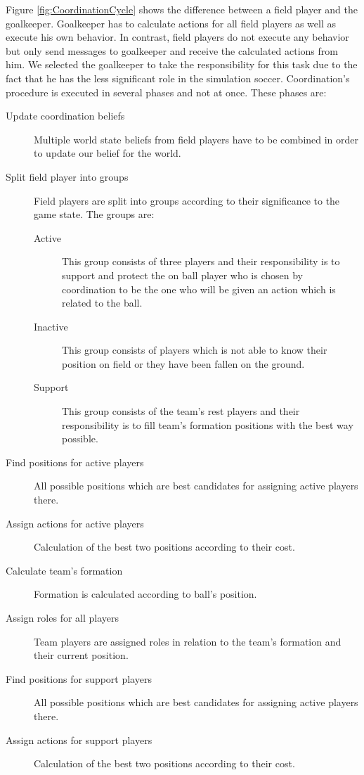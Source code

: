 Figure \ref{fig:CoordinationCycle} shows the difference between a field player and the goalkeeper. Goalkeeper has to calculate actions for all field players as well as execute his own behavior. In contrast, field players do not execute any behavior but only send messages to goalkeeper and receive the calculated actions from him. We selected the goalkeeper to take the responsibility for this task due to the fact that he has the less significant role in the simulation soccer. Coordination's procedure is executed in several phases and not at once. These phases are:
\begin{description}
\item[Update coordination beliefs] Multiple world state beliefs from field players have to be combined in order to update our belief for the world.
\item[Split field player into groups] Field players are split into groups according to their significance to the game state. The groups are:
\begin{description}
\item[Active] This group consists of three players and their responsibility is to support and protect the on ball player who is chosen by coordination to be the one who will be given an action which is related to the ball.
\item[Inactive] This group consists of players which is not able to know their position on field or they have been fallen on the ground.
\item[Support] This group consists of the team's rest players and their responsibility is to fill team's formation positions with the best way possible.
\end{description}
\item[Find positions for active players] All possible positions which are best candidates for assigning active players there.
\item[Assign actions for active players] Calculation of the best two positions according to their cost.
\item[Calculate team's formation] Formation is calculated according to ball's position.
\item[Assign roles for all players] Team players are assigned roles in relation to the team's formation and their current position.
\item[Find positions for support players] All possible positions which are best candidates for assigning active players there.
\item[Assign actions for support players] Calculation of the best two positions according to their cost.
\end{description}
